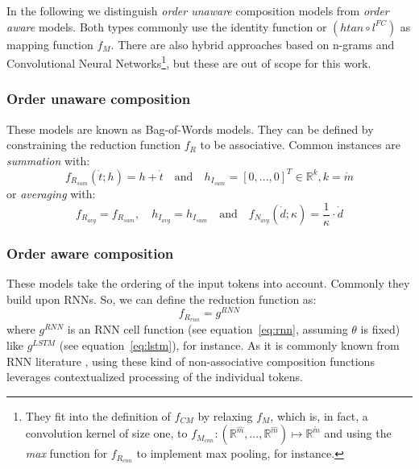 In the following we distinguish \textit{order unaware} composition models from \textit{order aware} models. Both types commonly use the identity function or $(htan \circ l^{FC})$ as mapping function $f_M$. There are also hybrid approaches based on n-grams and Convolutional Neural Networks\footnote{They fit into the definition of $f_{CM}$ by relaxing $f_M$, which is, in fact, a convolution kernel of size one, to $f_{M_{cnn}}: (\mathbb{R}^{\hat{m}}, ... ,\mathbb{R}^{\hat{m}}) \mapsto \mathbb{R}^{\mathring{m}}$ and using the \textit{max} function for $f_{R_{cnn}}$ to implement max pooling, for instance.}, but these are out of scope for this work.

\subsubsection*{Order unaware composition} 
These models are known as Bag-of-Words models. They can be defined by constraining the reduction function $f_R$ to be associative. Common instances are \textit{summation} with:
\begin{equation}
f_{R_{sum}}(\mathring{t}; h) = h + \mathring{t} \quad \text{and} \quad h_{I_{sum}} = [0, ..., 0]^T \in \mathbb{R}^k, k = \mathring{m}
\end{equation}
or \textit{averaging} with: 
\begin{equation}
f_{R_{avg}} = f_{R_{sum}}, \quad h_{I_{avg}} = h_{I_{sum}} \quad \text{and} \quad f_{N_{avg}}(\dot{d}; \kappa) = \frac{1}{\kappa} \cdot \dot{d}
\end{equation}

\subsubsection*{Order aware composition} \label{subsec:order_aware_composition}
These models take the ordering of the input tokens into account. Commonly they build upon \acl{RNN}s. So, we can define the reduction function as:
\begin{equation}
f_{R_{rnn}} = g^{RNN}
\end{equation}
where $g^{RNN}$ is an \ac{RNN} cell function (see equation~\eqref{eq:rnn}, assuming $\theta$ is fixed) like $g^{LSTM}$ (see equation~\eqref{eq:lstm}), for instance. As it is commonly known from \ac{RNN} literature , using these kind of non-associative composition functions leverages  contextualized processing of the individual tokens.

